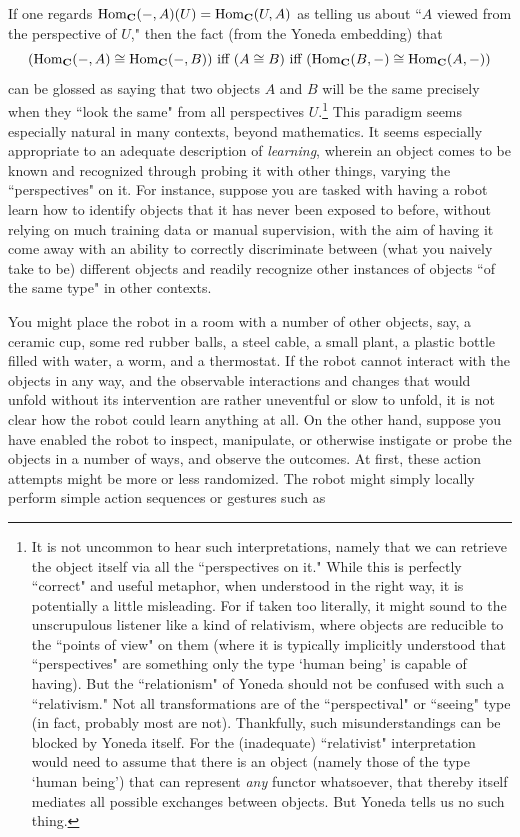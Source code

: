 \documentclass[a4paper]{book}
\theoremstyle{definition}
\theoremstyle{definition}
\theoremstyle{definition}
\theoremstyle{theorem}
\theoremstyle{definition}
\begin{document}
If one regards $\text{Hom}_{\textbf{C}}(\--, A)(U) = \text{Hom}_{\textbf{C}}(U, A)$ as telling us about ``$A$ viewed from the perspective of $U$," then the fact (from the Yoneda embedding) that 
\begin{equation*}
(\text{Hom}_{\textbf{C}}(\--, A) \cong  \text{Hom}_{\textbf{C}}(\--, B)) \text{ iff } (A \cong B) \text{ iff } (\text{Hom}_{\textbf{C}}(B, \--) \cong  \text{Hom}_{\textbf{C}}(A, \--))
\end{equation*} 
can be glossed as saying that two objects $A$ and $B$ will be the same precisely when they ``look the same" from all perspectives $U$.\footnote{It is not uncommon to hear such interpretations, namely that we can retrieve the object itself via all the ``perspectives on it." While this is perfectly ``correct" and useful metaphor, when understood in the right way, it is potentially a little misleading. For if taken too literally, it might sound to the unscrupulous listener like a kind of relativism, where objects are reducible to the ``points of view" on them (where it is typically implicitly understood that ``perspectives" are something only the type `human being' is capable of having). But the ``relationism" of Yoneda should not be confused with such a ``relativism." Not all transformations are of the ``perspectival" or ``seeing" type (in fact, probably most are not). Thankfully, such misunderstandings can be blocked by Yoneda itself. For the (inadequate) ``relativist" interpretation would need to assume that there is an object (namely those of the type `human being') that can represent \textit{any} functor whatsoever, that thereby itself mediates all possible exchanges between objects. But Yoneda tells us no such thing.} This paradigm seems especially natural in many contexts, beyond mathematics. It seems especially appropriate to an adequate description of \textit{learning}, wherein an object comes to be known and recognized through probing it with other things, varying the ``perspectives" on it. For instance, suppose you are tasked with having a robot learn how to identify objects that it has never been exposed to before, without relying on much training data or manual supervision, with the aim of having it come away with an ability to correctly discriminate between (what you naively take to be) different objects and readily recognize other instances of objects ``of the same type" in other contexts. \par
You might place the robot in a room with a number of other objects, say, a ceramic cup, some red rubber balls, a steel cable, a small plant, a plastic bottle filled with water, a worm, and a thermostat. If the robot cannot interact with the objects in any way, and the observable interactions and changes that would unfold without its intervention are rather uneventful or slow to unfold, it is not clear how the robot could learn anything at all. On the other hand, suppose you have enabled the robot to inspect, manipulate, or otherwise instigate or probe the objects in a number of ways, and observe the outcomes. At first, these action attempts might be more or less randomized. The robot might simply locally perform simple action sequences or gestures such as 
\end{document}
